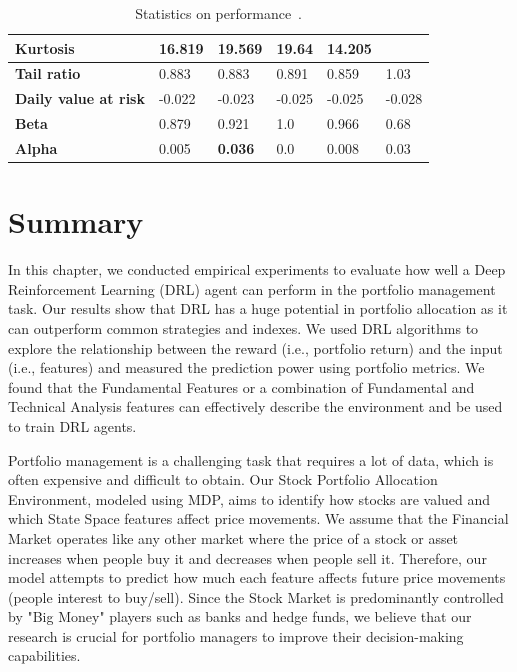 \documentclass[../xlapes02]{subfiles}
\begin{document}
\begin{table}[!ht]
\begin{tabular}{|l|l|l|l|l|l|}
            \textbf{Kurtosis} & 16.819          & 19.569         & 19.64 & 14.205 & ~ \\ \hline
            \textbf{Tail ratio}                & 0.883           & 0.883          & 0.891    & 0.859  & 1.03   \\ \hline
            \textbf{Daily value at risk}               & -0.022           & -0.023 & -0.025    & -0.025  & -0.028   \\ \hline
            \textbf{Beta}               & 0.879           & 0.921 & 1.0    & 0.966  & 0.68   \\ \hline
            \textbf{Alpha}               & 0.005           & \textbf{0.036} & 0.0    & 0.008  & 0.03   \\ \hline
        \end{tabular}
        \caption{Statistics on performance~\cite{FinRL-Tutorials, Pyfolio}.}
    \end{table}


    \newpage


    \section{Summary}\label{sec:summary}
    In this chapter, we conducted empirical experiments to evaluate how well a Deep Reinforcement Learning (DRL) agent can perform in the portfolio management task. Our results show that DRL has a huge potential in portfolio allocation as it can outperform common strategies and indexes. We used DRL algorithms to explore the relationship between the reward (i.e., portfolio return) and the input (i.e., features) and measured the prediction power using portfolio metrics. We found that the Fundamental Features or a combination of Fundamental and Technical Analysis features can effectively describe the environment and be used to train DRL agents.

    Portfolio management is a challenging task that requires a lot of data, which is often expensive and difficult to obtain. Our Stock Portfolio Allocation Environment, modeled using MDP, aims to identify how stocks are valued and which State Space features affect price movements. We assume that the Financial Market operates like any other market where the price of a stock or asset increases when people buy it and decreases when people sell it. Therefore, our model attempts to predict how much each feature affects future price movements (people interest to buy/sell). Since the Stock Market is predominantly controlled by "Big Money" players such as banks and hedge funds, we believe that our research is crucial for portfolio managers to improve their decision-making capabilities.
\end{document}
